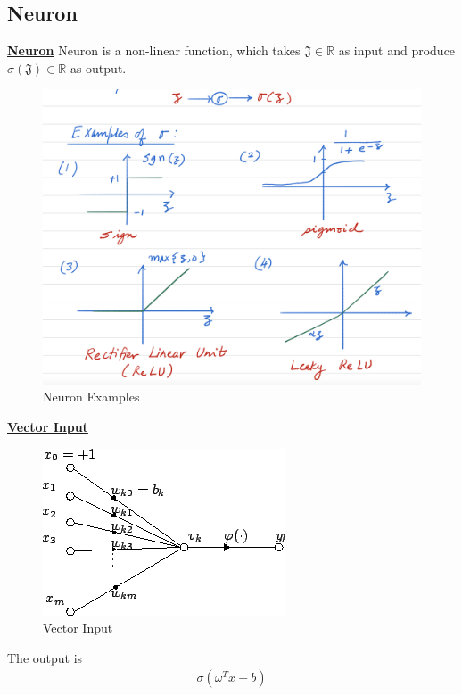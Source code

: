 \documentclass[11pt,a4paper]{article}
\begin{document}
\subsection{Neuron}
\underline{\textbf{Neuron}}
Neuron is a non-linear function, which takes $\mathfrak{J}\in \mathbb{R}$ as input and produce $\sigma(\mathfrak{J})\in \mathbb{R}$ as output.
\begin{center}\begin{figure}[htbp]
    \centering
    \includegraphics[scale=0.5]{NN.png}
    \caption{Neuron Examples}
    \label{Neuron}
\end{figure}\end{center}

\underline{\textbf{Vector Input}}
\begin{center}\begin{figure}[htbp]
    \centering
    \includegraphics[scale=0.5]{Vector Input}
    \caption{Vector Input}
    \label{}
\end{figure}\end{center}
The output is
\begin{equation}
    \begin{aligned}
        \sigma(\omega^Tx+b)
    \end{aligned}
    \nonumber
\end{equation}
\end{document}
